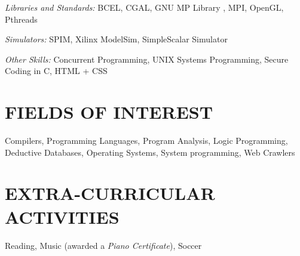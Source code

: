 \documentclass[margin]{res}
\begin{document}
\begin{resume}
        {\sl Libraries and Standards:}
        BCEL, CGAL, GNU MP Library , MPI, OpenGL, Pthreads

        {\sl Simulators:}
        SPIM, Xilinx ModelSim, SimpleScalar Simulator

        {\sl Other Skills:}
        Concurrent Programming, UNIX Systems Programming, Secure Coding in C, HTML + CSS

\section{FIELDS OF INTEREST} Compilers, Programming Languages, Program Analysis, Logic Programming, \\ 
Deductive Databases, Operating Systems, System programming, Web Crawlers

\section{EXTRA-CURRICULAR \\ ACTIVITIES}             
Reading, Music (awarded a {\it Piano Certificate}), Soccer

\end{resume}
\end{document}
